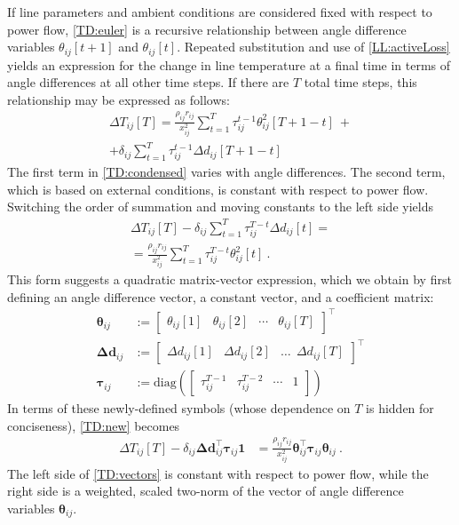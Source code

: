 \documentclass[conference]{IEEEtran}
\begin{document}
If line parameters and ambient conditions are considered fixed with respect to power flow, \eqref{TD:euler} is a recursive relationship between angle difference variables $\theta_{ij}[t+1]$ and $\theta_{ij}[t]$. Repeated substitution and use of \eqref{LL:activeLoss} yields an expression for the change in line temperature at a final time in terms of angle differences at all other time steps. If there are $T$ total time steps, this relationship may be expressed as follows:
\begin{multline}
\label{TD:condensed}
\Delta T_{ij}[T] = \frac{\rho_{ij} r_{ij}}{x_{ij}^2}\sum_{t=1}^{T}\tau_{ij}^{t-1}\theta_{ij}^2[T+1-t]~ + \\
+ \delta_{ij} \sum_{t=1}^{T}\tau_{ij}^{t-1}\Delta d_{ij} [T+1 - t]
\end{multline}
The first term in \eqref{TD:condensed} varies with angle differences. The second term, which is based on external conditions, is constant with respect to power flow. Switching the order of summation and moving constants to the left side yields
\begin{multline}
\label{TD:new}
\Delta T_{ij}[T] - \delta_{ij} \sum_{t=1}^{T}\tau_{ij}^{T-t}\Delta d_{ij} [t]  = \\
 = \frac{\rho_{ij}r_{ij}}{x_{ij}^2} \sum_{t=1}^{T} \tau_{ij}^{T-t}\theta_{ij}^2[t]~.
\end{multline}
This form suggests a quadratic matrix-vector expression, which we obtain by first defining an angle difference vector, a constant vector, and a coefficient matrix:
\begin{subequations}\label{TD:matvec}
\begin{align}
\boldsymbol{\theta}_{ij} &:= \begin{bmatrix}\theta_{ij}[1] & \theta_{ij}[2] & \cdots & \theta_{ij}[T] \end{bmatrix}^\top \\
\boldsymbol{\Delta d}_{ij} &:= \begin{bmatrix}
\Delta d_{ij}[1] & \Delta d_{ij}[2] & \ldots ~~ \Delta d_{ij}[T] 
\end{bmatrix}^\top \\
\boldsymbol{\tau}_{ij} &:= \text{diag}\left(\begin{bmatrix} \tau_{ij}^{T-1} & \tau_{ij}^{T-2} & \cdots & 1 \end{bmatrix}\right)
\end{align}
\end{subequations}
In terms of these newly-defined symbols (whose dependence on $T$ is hidden for conciseness), \eqref{TD:new} becomes
\begin{align}
\label{TD:vectors}
\Delta T_{ij}[T] - \delta_{ij} \boldsymbol{\Delta d}_{ij}^\top \boldsymbol{\tau}_{ij}\mathbf{1} &= \frac{\rho_{ij}r_{ij}}{x_{ij}^2} \boldsymbol{\theta}_{ij}^\top \boldsymbol{\tau}_{ij}\boldsymbol{\theta}_{ij}~.
\end{align}
The left side of \eqref{TD:vectors} is constant with respect to power flow, while the right side is a weighted, scaled two-norm of the vector of angle difference variables $\boldsymbol{\theta}_{ij}$.
\end{document}
